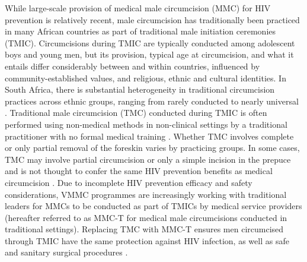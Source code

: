 \documentclass{article}
\begin{document}
While large-scale provision of medical male circumcision (MMC) for HIV prevention is relatively recent, male circumcision has traditionally been practiced in many African countries as part of traditional male initiation ceremonies (TMIC). Circumcisions during TMIC are typically conducted among adolescent boys and young men, but its provision, typical age at circumcision, and what it entails differ considerably between and within countries, influenced by community-established values, and religious, ethnic and cultural identities. In South Africa, there is substantial heterogeneity in traditional circumcision practices across ethnic groups, ranging from rarely conducted to nearly universal \autocite{peltzer2014prevalence, connolly2008male}. Traditional male circumcision (TMC) conducted during TMIC is often performed using non-medical methods in non-clinical settings by a traditional practitioner with no formal medical training \autocite{drain2006male, wilcken2010traditional, weiss2000male}. Whether TMC involves complete or only partial removal of the foreskin varies by practicing groups. In some cases, TMC may involve partial circumcision or only a simple incision in the prepuce and is not thought to confer the same HIV prevention benefits as medical circumcision \autocite{WHOTraditional, shaffer2007protective, bailey2008male}. Due to incomplete HIV prevention efficacy and safety considerations, VMMC programmes are increasingly working with traditional leaders for MMCs to be conducted as part of TMICs by medical service providers (hereafter referred to as MMC-T for medical male circumcisions conducted in traditional settings). Replacing TMC with MMC-T ensures men circumcised through TMIC have the same protection against HIV infection, as well as safe and sanitary surgical procedures \autocite{WHOTraditional}.
\end{document}
